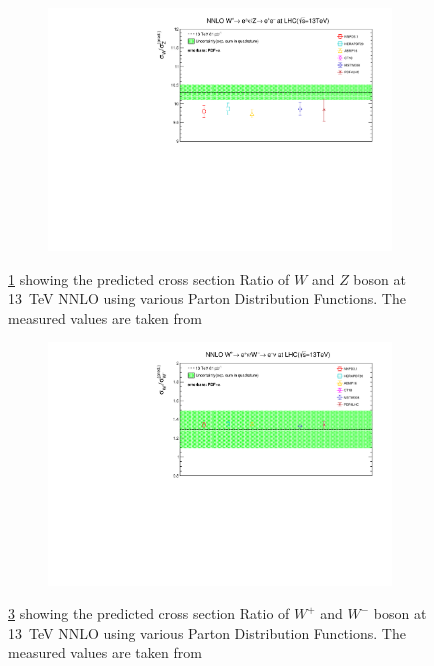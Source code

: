 \begin{figure}[H]
\centering
\begin{subfigure}{\textwidth}
\includegraphics[scale=0.7]{chapter4/Ratiowz.pdf}
\vspace*{-6mm}
\caption{}
\label{Ratiowz}
\end{subfigure}
\caption{\ref{Ratiowz} showing the predicted cross section Ratio of $W$ and $Z$ boson at 13~TeV NNLO using various Parton Distribution Functions. The measured values are taken from~\cite{Aad_2016} }
\label{RWZ}
\end{figure}

\begin{figure}[H]
\centering
\begin{subfigure}{\textwidth}
\includegraphics[scale=0.7]{chapter4/Ratioww13.pdf}
\vspace*{-6mm}
\caption{}
\label{Ratioww}
\end{subfigure}
\caption{\ref{Ratioww} showing the predicted cross section Ratio of $W^{+}$ and $W^{-}$ boson at 13~TeV NNLO using various Parton Distribution Functions. The measured values are taken from~\cite{Aad_2016} }
\label{RWw}
\end{figure}

